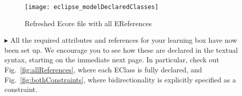 \begin{itemize}
\vspace{1cm}

\begin{figure}[htbp]
	\centering
  \texttt{[image: eclipse\_modelDeclaredClasses]}
	\caption{Refreshed Ecore file with all EReferences}
	\label{fig:model_allClasses}
\end{figure}

\vspace{1cm}

\item[$\blacktriangleright$] All the required attributes and references for your learning box have now been set up. We encourage you to see how these are
declared in the textual syntax, starting on the immediate next page. In particular, check out Fig.~\ref{fig:allReferences}, where each EClass is fully
declared, and Fig.~\ref{fig:bothConstraints}, where bidirectionality is explicitly specified as a constraint.


\end{itemize}
